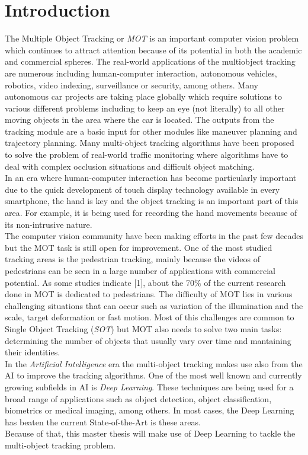 \chapter{Introduction}\label{cap.introduccion}
\setlength{\parindent}{0pt}
The Multiple Object Tracking or \textit{MOT} is an important computer vision problem which continues to attract attention because of its potential in both the academic and commercial spheres. The real-world applications of the multiobject tracking are numerous including human-computer interaction, autonomous vehicles, robotics, video indexing, surveillance or security, among others. Many autonomous car projects are taking place globally which require solutions to various different problems including to keep an eye (not literally) to all other moving objects in the area where the car is located. The outputs from the tracking module are a basic input for other modules like maneuver planning and trajectory planning. Many multi-object tracking algorithms have been proposed to solve the problem of real-world traffic monitoring where algorithms have to deal with complex occlusion situations and difficult object matching.\\
In an era where human-computer interaction has become particularly important due to the quick development of touch display technology available in every smartphone, the hand is key and the object tracking is an important part of this area. For example, it is being used for recording the hand movements because of its non-intrusive nature.
\\
The computer vision community have been making efforts in the past few decades but the MOT task is still open for improvement. One of the most studied tracking areas is the pedestrian tracking, mainly because the videos of pedestrians can be seen in a large number of applications with commercial potential. As some studies indicate [1], about the 70\% of the current research done in MOT is dedicated to pedestrians. The difficulty of MOT lies in various challenging situations that can occur such as variation of the illumination and the scale, target deformation or fast motion. Most of this challenges are common to Single Object Tracking (\textit{SOT}) but MOT also needs to solve two main tasks: determining the number of objects that usually vary over time and mantaining their identities.\\
In the \textit{Artificial Intelligence} era the multi-object tracking makes use also from the AI to improve the tracking algorithms. One of the most well known and currently growing subfields in AI is \textit{Deep Learning}. These techniques are being used for a broad range of applications such as object detection, object classification, biometrics or medical imaging, among others. In most cases, the Deep Learning has beaten the current State-of-the-Art is these areas.\\
Because of that, this master thesis will make use of Deep Learning to tackle the multi-object tracking problem.

